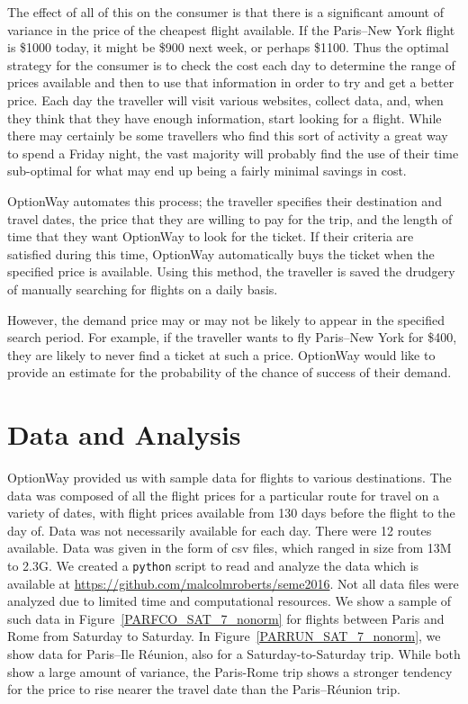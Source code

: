 \documentclass{article}
\begin{document}
The effect of all of this on the consumer is that there is a
significant amount of variance in the price of the cheapest flight
available.  If the Paris--New York flight is \$1000 today, it might be
\$900 next week, or perhaps \$1100.  Thus the optimal strategy for the
consumer is to check the cost each day to determine the range of
prices available and then to use that information in order to try and
get a better price.  Each day the traveller will visit various
websites, collect data, and, when they think that they have enough
information, start looking for a flight.  While there may certainly be
some travellers who find this sort of activity a great way to spend a
Friday night, the vast majority will probably find the use of their
time sub-optimal for what may end up being a fairly minimal savings in
cost.

OptionWay automates this process; the traveller specifies their
destination and travel dates, the price that they are willing to pay
for the trip, and the length of time that they want OptionWay to look
for the ticket.  If their criteria are satisfied during this time,
OptionWay automatically buys the ticket when the specified price is
available.  Using this method, the traveller is saved the drudgery of
manually searching for flights on a daily basis.

However, the demand price may or may not be likely to appear in the
specified search period.  For example, if the traveller wants to fly
Paris--New York for \$400, they are likely to never find a ticket at
such a price.  OptionWay would like to provide an estimate for the
probability of the chance of success of their demand.

\section{Data and Analysis}

OptionWay provided us with sample data for flights to various
destinations.  The data was composed of all the flight prices for a
particular route for travel on a variety of dates, with flight prices
available from 130 days before the flight to the day of.  Data was not
necessarily available for each day.  There were 12 routes available.
Data was given in the form of csv files, which ranged in size from 13M
to 2.3G.  We created a \texttt{python} script to read and analyze the
data which is available at
\url{https://github.com/malcolmroberts/seme2016}.  Not all data files
were analyzed due to limited time and computational resources.  We
show a sample of such data in Figure~\ref{PARFCO_SAT_7_nonorm} for
flights between Paris and Rome from Saturday to Saturday.  In
Figure~\ref{PARRUN_SAT_7_nonorm}, we show data for Paris--Ile Réunion,
also for a Saturday-to-Saturday trip.  While both show a large amount
of variance, the Paris-Rome trip shows a stronger tendency for the
price to rise nearer the travel date than the Paris--Réunion trip.
\end{document}
